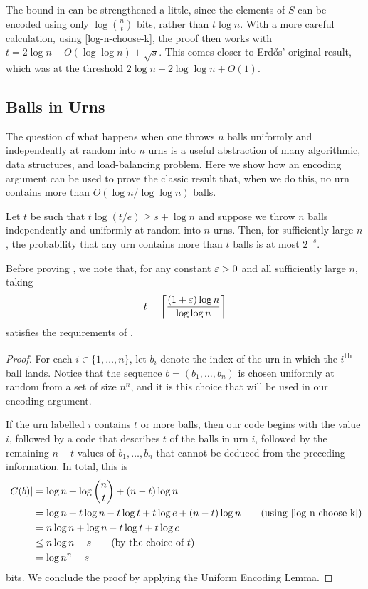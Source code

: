 \documentclass{patmorin}
\begin{document}
\begin{rem}
  The bound in  can be strengthened a little,
  since the elements of $S$ can be encoded using only
  $\log\binom{n}{t}$ bits, rather than $t\log n$.  With a more careful
  calculation, using \eqref{log-n-choose-k}, the proof then works with
  $t = 2\log n +O(\log\log n) + \sqrt{s}$. This comes closer to Erdős'
  original result, which was at the threshold $2\log n - 2\log\log n +
  O(1)$.
\end{rem}


\subsection{Balls in Urns}

The question of what happens when one throws $n$ balls uniformly and
independently at random into $n$ urns is a useful abstraction of many
algorithmic, data structures, and load-balancing problem.  Here we
show how an encoding argument can be used to prove the classic result
that, when we do this, no urn contains more than $O(\log n/\log\log
n)$ balls.

\begin{thm}
  Let $t$ be such that $t\log(t/e) \ge s+\log n$ and suppose we throw
  $n$ balls independently and uniformly at random into $n$ urns. Then,
  for sufficiently large $n$, the probability that any urn contains
  more than $t$ balls is at most $2^{-s}$.
\end{thm}

Before proving , we note that, for any constant $\varepsilon >0$
and all sufficiently large $n$, taking
\[
  t = {\left\lceil \frac{(1+\varepsilon)\log n}{\log\log n} \right\rceil}
\] 
satisfies the requirements of .

\begin{proof}
  For each $i\in\{1,\ldots,n\}$, let $b_i$ denote the index of the urn
  in which the $i$\textsuperscript{th} ball lands. Notice that the
  sequence $b = (b_1,\ldots,b_n)$ is chosen uniformly at random from a
  set of size $n^n$, and it is this choice that will be used in our
  encoding argument.

  If the urn labelled $i$ contains $t$ or more balls, then our code
  begins with the value $i$, followed by a code that describes $t$ of
  the balls in urn $i$, followed by the remaining $n-t$ values of
  $b_1,\ldots,b_n$ that cannot be deduced from the preceding
  information.  In total, this is
  \begin{align*}
    |C(b)| &= \log n + \log\binom{n}{t} + (n-t)\log n \\
           &= \log n + t\log n - t\log t + t\log e + (n-t)\log n
             \tag{using \eqref{log-n-choose-k}} \\
           & = n \log n + \log n - t\log t + t\log e \\
           & \le n \log n - s \tag{by the choice of $t$} \\
           & = \log n^n - s
  \end{align*}
  bits. We conclude the proof by applying the Uniform Encoding Lemma.
\end{proof}
\end{document}
